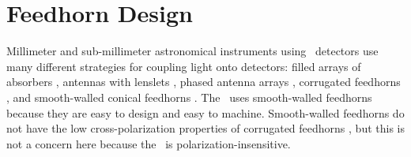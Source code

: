 
\section{Feedhorn Design}\label{sec:ch4-feedhorn-design}


Millimeter and sub-millimeter astronomical instruments using \TES\ detectors use many different strategies for coupling light onto detectors: filled arrays of absorbers \cite{swetz_overview_2011,holland_scuba-2:_2013}, antennas with lenslets \cite{keating_ultra_2011}, phased antenna arrays \cite{obrient_antenna-coupled_2012}, corrugated feedhorns \cite{austermann_sptpol:_2012,niemack_actpol:_2010}, and smooth-walled conical feedhorns \cite{schwan_invited_2011,carlstrom_10_2011}.
The \Imager\ uses smooth-walled feedhorns because they are easy to design and easy to machine.
Smooth-walled feedhorns do not have the low cross-polarization properties of corrugated feedhorns \cite{clarricoats_corrugated_1984}, but this is not a concern here because the \Imager\ is polarization-insensitive.

